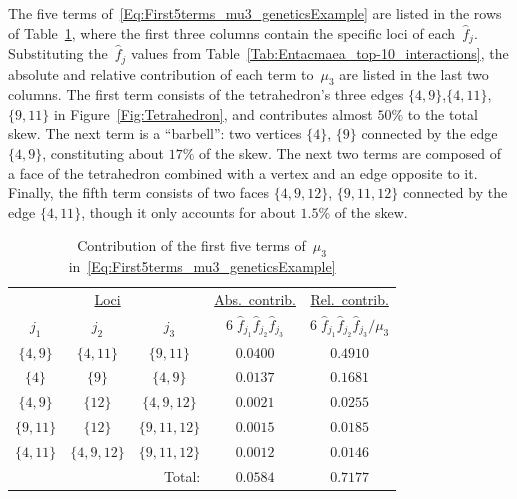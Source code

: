 \documentclass[letterpaper,11pt]{article}
\newcommand{\set}[1]{\{ #1 \}}
\theoremstyle{definition} \newtheorem{remark}{Remark}
\begin{document}
The five terms of~\eqref{Eq:First5terms_mu3_geneticsExample} are listed in the rows of Table~\ref{Tab:mu3_terms}, where the first three columns contain the specific loci of each~$\hat{f}_j$. Substituting the~$\hat{f}_j$ values from Table~\ref{Tab:Entacmaea_top-10_interactions}, the absolute and relative contribution of each term to~$\mu_3$ are listed in the last two columns. The first term consists of the tetrahedron's three edges $\set{4,9}$,$\set{4,11}$,$\set{9,11}$ in Figure~\ref{Fig:Tetrahedron}, and contributes almost $50\%$ to the total skew. The next term is a ``barbell'': two vertices $\set{4}$, $\set{9}$ connected by the edge $\set{4,9}$, constituting about $17\%$ of the skew. The next two terms are composed of a face of the tetrahedron combined with a vertex and an edge opposite to it. Finally, the fifth term consists of two faces $\set{4,9,12}$, $\set{9,11,12}$ connected by the edge $\set{4,11}$, though it only accounts for about $1.5\%$ of the skew.

\begin{table}[!htb]
\centering
  \caption{Contribution of the first five terms of~$\mu_3$ in~\eqref{Eq:First5terms_mu3_geneticsExample}
\label{Tab:mu3_terms}}
  \vspace{5pt}
  \begin{tabular}{c|c|c||c|c}
    \multicolumn{3}{c}{\underline{Loci}} & \multicolumn{1}{c}{\underline{Abs.~contrib.}} & \multicolumn{1}{c}{\underline{Rel.~contrib.}}\\
    \multicolumn{1}{c}{$j_1$} & \multicolumn{1}{c}{$j_2$} & \multicolumn{1}{c}{$j_3$} & \multicolumn{1}{c}{$6 \;\! \hat{f}_{j_1} \hat{f}_{j_2} \hat{f}_{j_3}$} & \multicolumn{1}{c}{$6 \;\! \hat{f}_{j_1} \hat{f}_{j_2} \hat{f}_{j_3}/\mu_3$} \\
    \hline
    $\set{4,9}$ & $\set{4,11}$ & $\set{9,11}$ & $0.0400$ & $0.4910$\\
    $\set{4}$ & $\set{9}$ & $\set{4,9}$ & $0.0137$ & $0.1681$\\
    $\set{4,9}$ & $\set{12}$ & $\set{4,9,12}$ & $0.0021$ & $0.0255$\\
    $\set{9,11}$ & $\set{12}$ & $\set{9,11,12}$ & $0.0015$ & $0.0185$\\
    $\set{4,11}$ & $\set{4,9,12}$ & $\set{9,11,12}$ & $0.0012$ & $0.0146$\\
    \hline
    \multicolumn{2}{c}{} & \multicolumn{1}{r}{Total:} & \multicolumn{1}{c}{$0.0584$} &\multicolumn{1}{c}{$0.7177$} \\
    \end{tabular}\\[10pt]
\end{table}
\end{document}

